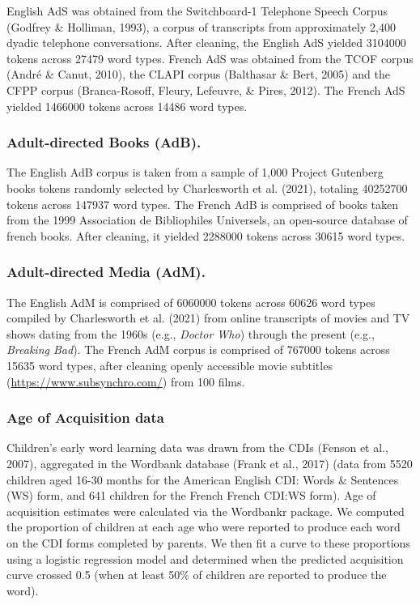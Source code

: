 \documentclass[10pt, letterpaper]{article}
\begin{document}
English AdS was obtained from the Switchboard-1 Telephone Speech Corpus
(Godfrey \& Holliman, 1993), a corpus of transcripts from approximately
2,400 dyadic telephone conversations. After cleaning, the English AdS
yielded 3104000 tokens across 27479 word types. French AdS was obtained
from the TCOF corpus (André \& Canut, 2010), the CLAPI corpus (Balthasar
\& Bert, 2005) and the CFPP corpus (Branca-Rosoff, Fleury, Lefeuvre, \&
Pires, 2012). The French AdS yielded 1466000 tokens across 14486 word
types.

\hypertarget{adult-directed-books-adb.}{%
\subsubsection{Adult-directed Books
(AdB).}\label{adult-directed-books-adb.}}

The English AdB corpus is taken from a sample of 1,000 Project Gutenberg
books tokens randomly selected by Charlesworth et al. (2021), totaling
40252700 tokens across 147937 word types. The French AdB is comprised of
books taken from the 1999 Association de Bibliophiles Universels, an
open-source database of french books. After cleaning, it yielded 2288000
tokens across 30615 word types.

\hypertarget{adult-directed-media-adm.}{%
\subsubsection{Adult-directed Media
(AdM).}\label{adult-directed-media-adm.}}

The English AdM is comprised of 6060000 tokens across 60626 word types
compiled by Charlesworth et al. (2021) from online transcripts of movies
and TV shows dating from the 1960s (e.g., \emph{Doctor Who}) through the
present (e.g., \emph{Breaking Bad}). The French AdM corpus is comprised
of 767000 tokens across 15635 word types, after cleaning openly
accessible movie subtitles (\url{https://www.subsynchro.com/}) from 100
films.

\hypertarget{age-of-acquisition-data}{%
\subsubsection{Age of Acquisition data}\label{age-of-acquisition-data}}

Children's early word learning data was drawn from the CDIs (Fenson et
al., 2007), aggregated in the Wordbank database (Frank et al., 2017)
(data from 5520 children aged 16-30 months for the American English CDI:
Words \& Sentences (WS) form, and 641 children for the French French
CDI:WS form). Age of acquisition estimates were calculated via the
Wordbankr package. We computed the proportion of children at each age
who were reported to produce each word on the CDI forms completed by
parents. We then fit a curve to these proportions using a logistic
regression model and determined when the predicted acquisition curve
crossed 0.5 (when at least 50\% of children are reported to produce the
word).
\end{document}
